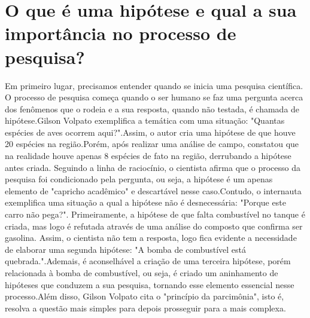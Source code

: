 \section{\esp O que é uma hipótese e qual a sua importância no processo de pesquisa?
}

	Em primeiro lugar, precisamos entender quando se inicia uma pesquisa científica. O processo de pesquisa começa quando o ser humano se faz uma pergunta acerca
dos fenômenos que o rodeia e a sua resposta, quando não testada, é chamada de hipótese.Gilson Volpato exemplifica a temática com uma situação: "Quantas espécies
de aves ocorrem aqui?".Assim, o autor cria uma hipótese de que houve 20 espécies na região.Porém, após realizar uma análise de campo, constatou que na realidade 
houve apenas 8 espécies de fato na região, derrubando a hipótese antes criada. Seguindo a linha de raciocínio, o cientista afirma que o processo da pesquisa foi
condicionado pela pergunta, ou seja, a hipótese é um apenas elemento de "capricho acadêmico" e descartável nesse caso.Contudo, o internauta exemplifica uma situação
a qual a hipótese não é desnecessária: "Porque este carro não pega?". Primeiramente, a hipótese de que falta combustível no tanque é criada, mas logo é refutada através
de uma análise do composto que confirma ser gasolina. Assim, o cientista não tem a resposta, logo fica evidente a necessidade de elaborar uma segunda hipótese: "A bomba
de combustível está quebrada.".Ademais, é aconselhável a criação de uma terceira hipótese, porém relacionada à bomba de combustível, ou seja, é criado um aninhamento
de hipóteses que conduzem a sua pesquisa, tornando esse elemento essencial nesse processo.Além disso, Gilson Volpato cita o  "princípio da parcimônia", isto é, resolva
a questão mais simples para depois prosseguir para a mais complexa.

